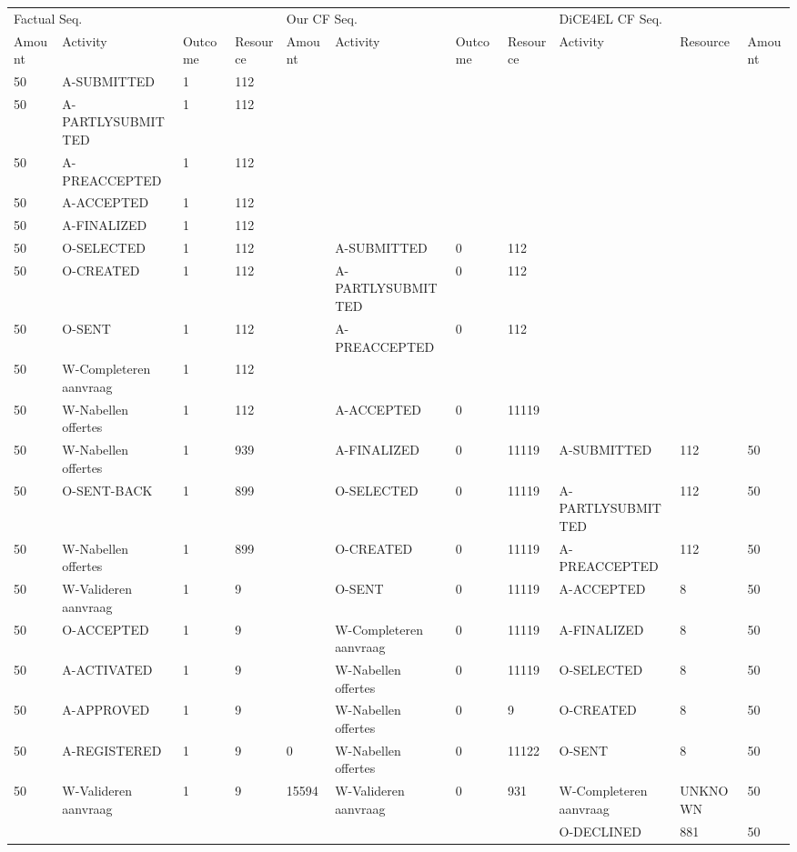 \begin{tabular}{lllllllllll}
\toprule
\multicolumn{4}{l}{Factual Seq.} & \multicolumn{4}{l}{Our CF Seq.} & \multicolumn{3}{l}{DiCE4EL CF Seq.} \\
Amount & Activity & Outcome & Resource & Amount & Activity & Outcome & Resource & Activity & Resource & Amount \\
\midrule
50 & A-SUBMITTED & 1 & 112 &  &  &  &  &  &  &  \\
50 & A-PARTLYSUBMITTED & 1 & 112 &  &  &  &  &  &  &  \\
50 & A-PREACCEPTED & 1 & 112 &  &  &  &  &  &  &  \\
50 & A-ACCEPTED & 1 & 112 &  &  &  &  &  &  &  \\
50 & A-FINALIZED & 1 & 112 &  &  &  &  &  &  &  \\
50 & O-SELECTED & 1 & 112 &  & A-SUBMITTED & 0 & 112 &  &  &  \\
50 & O-CREATED & 1 & 112 &  & A-PARTLYSUBMITTED & 0 & 112 &  &  &  \\
50 & O-SENT & 1 & 112 &  & A-PREACCEPTED & 0 & 112 &  &  &  \\
50 & W-Completeren aanvraag & 1 & 112 &  &  &  &  &  &  &  \\
50 & W-Nabellen offertes & 1 & 112 &  & A-ACCEPTED & 0 & 11119 &  &  &  \\
50 & W-Nabellen offertes & 1 & 939 &  & A-FINALIZED & 0 & 11119 & A-SUBMITTED & 112 & 50 \\
50 & O-SENT-BACK & 1 & 899 &  & O-SELECTED & 0 & 11119 & A-PARTLYSUBMITTED & 112 & 50 \\
50 & W-Nabellen offertes & 1 & 899 &  & O-CREATED & 0 & 11119 & A-PREACCEPTED & 112 & 50 \\
50 & W-Valideren aanvraag & 1 & 9 &  & O-SENT & 0 & 11119 & A-ACCEPTED & 8 & 50 \\
50 & O-ACCEPTED & 1 & 9 &  & W-Completeren aanvraag & 0 & 11119 & A-FINALIZED & 8 & 50 \\
50 & A-ACTIVATED & 1 & 9 &  & W-Nabellen offertes & 0 & 11119 & O-SELECTED & 8 & 50 \\
50 & A-APPROVED & 1 & 9 &  & W-Nabellen offertes & 0 & 9 & O-CREATED & 8 & 50 \\
50 & A-REGISTERED & 1 & 9 & 0 & W-Nabellen offertes & 0 & 11122 & O-SENT & 8 & 50 \\
50 & W-Valideren aanvraag & 1 & 9 & 15594 & W-Valideren aanvraag & 0 & 931 & W-Completeren aanvraag & UNKNOWN & 50 \\
 &  &  &  &  &  &  &  & O-DECLINED & 881 & 50 \\
\bottomrule
\end{tabular}
